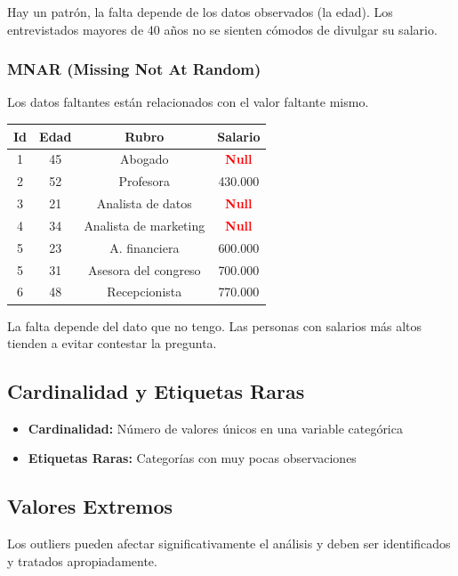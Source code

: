 \documentclass[12pt]{article}
\begin{document}
Hay un patrón, la falta depende de los datos observados (la edad). Los entrevistados mayores de 40 años no se sienten cómodos de divulgar su salario.

\subsubsection{MNAR (Missing Not At Random)}
Los datos faltantes están relacionados con el valor faltante mismo.

\vspace{0.5cm}
\begin{center}
\begin{tabular}{|c|c|c|c|}
\hline
\textbf{Id} & \textbf{Edad} & \textbf{Rubro} & \textbf{Salario} \\
\hline
1 & 45 & Abogado & \textcolor{red}{\textbf{Null}} \\
\hline
2 & 52 & Profesora & 430.000 \\
\hline
3 & 21 & Analista de datos & \textcolor{red}{\textbf{Null}} \\
\hline
4 & 34 & Analista de marketing & \textcolor{red}{\textbf{Null}} \\
\hline
5 & 23 & A. financiera & 600.000 \\
\hline
5 & 31 & Asesora del congreso & 700.000 \\
\hline
6 & 48 & Recepcionista & 770.000 \\
\hline
\end{tabular}
\end{center}
\vspace{0.5cm}

La falta depende del dato que no tengo. Las personas con salarios más altos tienden a evitar contestar la pregunta.

\subsection{Cardinalidad y Etiquetas Raras}
\begin{itemize}
    \item \textbf{Cardinalidad:} Número de valores únicos en una variable categórica
    \item \textbf{Etiquetas Raras:} Categorías con muy pocas observaciones
\end{itemize}

\subsection{Valores Extremos}
Los outliers pueden afectar significativamente el análisis y deben ser identificados y tratados apropiadamente.
\end{document}
